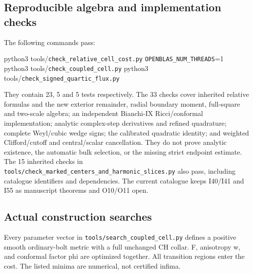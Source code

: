 \documentclass[
  10pt,
]{article}
\newenvironment{Shaded}{}{}
\newcommand{\ExtensionTok}[1]{#1}
\newcommand{\NormalTok}[1]{#1}
\newcommand{\VariableTok}[1]{\textcolor[rgb]{0.10,0.09,0.49}{#1}}
\begin{document}
\hypertarget{reproducible-algebra-and-implementation-checks}{%
\subsection{Reproducible algebra and implementation
checks}\label{reproducible-algebra-and-implementation-checks}}

The following commands pass:

\begin{Shaded}
\begin{Highlighting}[]
\ExtensionTok{python3}\NormalTok{ tools/\nolinkurl{check_relative_cell_cost.py}}
\VariableTok{\nolinkurl{OPENBLAS_NUM_THREADS}=}\NormalTok{1 }\ExtensionTok{python3}\NormalTok{ tools/\nolinkurl{check_coupled_cell.py}}
\ExtensionTok{python3}\NormalTok{ tools/\nolinkurl{check_signed_quartic_flux.py}}
\end{Highlighting}
\end{Shaded}

They contain 23, 5 and 5 tests respectively. The 33 checks cover
inherited relative formulas and the new exterior remainder, radial
boundary moment, full-square and two-scale algebra; an independent
Bianchi-IX Ricci/conformal implementation; analytic complex-step
derivatives and refined quadrature; complete Weyl/cubic wedge signs; the
calibrated quadratic identity; and weighted Clifford/cutoff and
central/scalar cancellation. They do not prove analytic existence, the
automatic bulk selection, or the missing strict endpoint estimate. The
15 inherited checks in
\nolinkurl{tools/check_marked_centers_and_harmonic_slices.py} also
pass, including catalogue identifiers and dependencies. The current
catalogue keeps I40/I41 and I55 as manuscript theorems and O10/O11 open.

\hypertarget{actual-construction-searches}{%
\subsection{Actual construction
searches}\label{actual-construction-searches}}

Every parameter vector in \nolinkurl{tools/search_coupled_cell.py}
defines a positive smooth ordinary-bolt metric with a full unchanged CH
collar. F, anisotropy w, and conformal factor phi are optimized
together. All transition regions enter the cost. The listed minima are
numerical, not certified infima.
\end{document}
